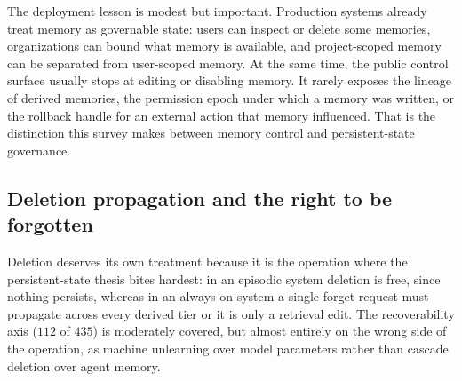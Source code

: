 The deployment lesson is modest but important. Production systems already treat memory as governable state: users can inspect or delete some memories, organizations can bound what memory is available, and project-scoped memory can be separated from user-scoped memory. At the same time, the public control surface usually stops at editing or disabling memory. It rarely exposes the lineage of derived memories, the permission epoch under which a memory was written, or the rollback handle for an external action that memory influenced. That is the distinction this survey makes between memory control and persistent-state governance.

\subsection{Deletion propagation and the right to be forgotten}

Deletion deserves its own treatment because it is the operation where the persistent-state thesis bites hardest: in an episodic system deletion is free, since nothing persists, whereas in an always-on system a single forget request must propagate across every derived tier or it is only a retrieval edit. The recoverability axis ($112$ of $435$) is moderately covered, but almost entirely on the wrong side of the operation, as machine unlearning over model parameters rather than cascade deletion over agent memory.

